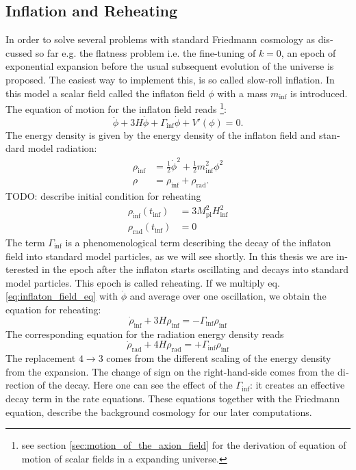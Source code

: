 \documentclass[master,       %
               twoside,        %
               BCOR10mm,       %
               english,ngerman, %
               ]{GAUBM}
\begin{document}
\begin{otherlanguage}{english}
\subsection{Inflation and Reheating}
In order to solve several problems with standard Friedmann cosmology as discussed so far e.g. the flatness problem i.e. the fine-tuning of $k = 0$,
an epoch of exponential expansion before the usual subsequent evolution of the universe is proposed. The easiest way to implement this, is so called slow-roll inflation. In this model a scalar field called the inflaton field $\phi$ with a mass $m_\mathrm{inf}$ is introduced. The equation of motion for the inflaton field reads \footnote{see section \ref{sec:motion_of_the_axion_field} for the derivation of equation of motion of scalar fields in a expanding universe.}:
\begin{equation}
	\label{eq:inflaton_field_eq}
	\ddot{\phi} + 3 H \dot{\phi} + \Gamma_\mathrm{inf} \dot{\phi} + V'(\phi) = 0.
\end{equation}
The energy density is given by the energy density of the inflaton field
and standard model radiation:
\begin{align}
	\rho_\mathrm{inf} &= \frac{1}{2} \dot{\phi}^2 + \frac{1}{2} m_\mathrm{inf}^2 \phi^2 \\
	\rho &= \rho_\mathrm{inf} + \rho_\mathrm{rad}.
\end{align}
TODO: describe initial condition for reheating
\begin{align}
	\rho_\mathrm{inf}(t_\mathrm{inf}) &= 3 M_\mathrm{pl}^2 H_\mathrm{inf}^2 \nonumber \\
	\rho_\mathrm{rad}(t_\mathrm{inf}) &= 0
\end{align}
The term $\Gamma_\mathrm{inf}$ is a phenomenological term describing the decay of the inflaton field into standard model particles, as we will see shortly. In this thesis we are interested in the epoch after the inflaton starts oscillating and decays into standard model particles. This epoch is called reheating.
If we multiply eq. \eqref{eq:inflaton_field_eq} with $\dot{\phi}$ and average over one oscillation, we obtain
the equation for reheating:
\begin{equation}
	\dot{\rho}_\mathrm{inf} + 3 H \rho_\mathrm{inf} = - \Gamma_\mathrm{inf} \rho_\mathrm{inf}
\end{equation}
The corresponding equation for the radiation energy density reads
\begin{equation}
	\dot{\rho}_\mathrm{rad} + 4 H \rho_\mathrm{rad} = + \Gamma_\mathrm{inf} \rho_\mathrm{inf}
\end{equation}
The replacement $4 \to 3$ comes from the different scaling of the energy density from the expansion. The change of sign on the right-hand-side comes from the direction of the decay. Here one can see the effect of the $\Gamma_{\mathrm{inf}}$: it creates an effective decay term in the rate equations.
These equations together with the Friedmann equation, describe the background cosmology for our later computations.


\end{otherlanguage}
\end{document}
